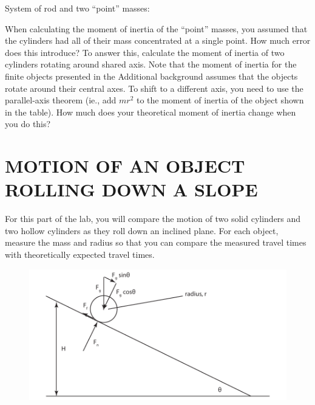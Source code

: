\documentclass[11pt,letterpaper]{article}
\begin{document}
System of rod and two ``point'' masses:\\
\vspace{6cm}

When calculating the moment of inertia of the ``point'' masses, you assumed that the cylinders had all of their mass concentrated at a single point. How much error does this introduce? To answer this, calculate the moment of inertia of two cylinders rotating around shared axis. Note that the moment of inertia for the finite objects presented in the Additional background assumes that the objects rotate around their central axes. To shift to a different axis, you need to use the parallel-axis theorem (ie., add $mr^2$ to the moment of inertia of the object shown in the table). How much does your theoretical moment of inertia change when you do this?

\section{MOTION OF AN OBJECT ROLLING DOWN A SLOPE}
For this part of the lab, you will compare the motion of two solid cylinders and two hollow cylinders as they roll down an inclined plane. For each object, measure the mass and radius so that you can compare the measured travel times with theoretically expected travel times. 



\begin{figure}[h]
\begin{center}
\includegraphics{./rolling_ball}
\end{center}
\end{figure}
\end{document}
